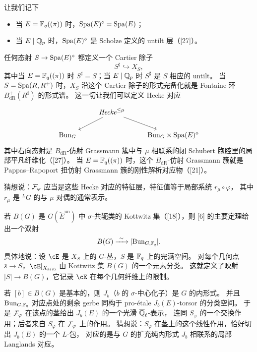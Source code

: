 让我们记下
\begin{itemize}
\item 当 $E=\mathbb{F}_q((\pi))$ 时，$\mathrm{Spa}(E)^\diamond=\mathrm{Spa}(E)$；
\item 当 $E\mid\mathbb{Q}_p$ 时，$\mathrm{Spa}(E)^\diamond$ 是 Scholze 定义的 untilt 层（[27]）。
\end{itemize}
任何态射 $S\to\mathrm{Spa}(E)^\diamond$ 都定义一个 Cartier 除子
\[
S^\sharp\hookrightarrow X_S,
\]
其中当 $E=\mathbb{F}_q((\pi))$ 时 $S^\sharp=S$；当 $E\mid\mathbb{Q}_p$ 时 $S^\sharp$ 是 $S$ 相应的 untilt。
当 $S=\mathrm{Spa}(R,R^+)$ 时，$X_S$ 沿这个 Cartier 除子的形式完备化就是 Fontaine 环 $B_{\mathrm{dR}}^+(R^\sharp)$ 的形式谱。
这一切让我们可以定义 Hecke 对应
\begin{equation}\label{eq:0.1}
\begin{tikzcd}
& \Hck^{\le\mu} \arrow[dl] \arrow[dr] & \\
\Bun_G & & \Bun_G\times\Spa(E)^\diamond
\end{tikzcd}
\end{equation}
其中右向态射是 $B_{\mathrm{dR}}$-仿射 Grassmann 簇中与 $\mu$ 相联系的闭 Schubert 胞腔里的局部平凡纤维化（[27]）。
当 $E=\mathbb{F}_q((\pi))$ 时，这个 $B_{\mathrm{dR}}$-仿射 Grassmann 簇就是 Pappas–Rapoport 扭仿射 Grassmann 簇的刚性解析对应物（[21]）。

猜想说：$\mathcal{F}_\varphi$ 应当是这些 Hecke 对应的特征层，特征值等于局部系统 $r_\mu\circ\varphi$，
其中 $r_\mu$ 是 ${}^{L}G$ 的与 $\mu$ 对偶的通常表示。

若 $B(G)$ 是 $G(\breve E^{\mathrm{un}})$ 中 $\sigma$-共轭类的 Kottwitz 集（[18]），则 [6] 的主要定理给出一个双射
\[
B(G)\xrightarrow{\ \sim\ }|\Bun_{G,\FF_q}|.
\]
具体地说：设 $\cE$ 是 $X_S$ 上的 $G$-丛，$S$ 是 $\mathbb{F}_q$ 上的完满空间。
对每个几何点 $\bar s\to S$，$\cE|_{X_{k(\bar s)}}$ 由 Kottwitz 集 $B(G)$ 的一个元素分类。
这就定义了映射 $|S|\to B(G)$，它记录 $\cE$ 在每个几何纤维上的限制。

若 $[b]\in B(G)$ 是基本的，则 $J_b$（$b$ 的 $\sigma$-中心化子）是 $G$ 的内形式。
并且 $\mathrm{Bun}_{G,\mathbb{F}_q}$ 对应点处的剩余 gerbe 同构于 pro-étale $J_b(E)$-torsor 的分类空间。
于是 $\mathcal{F}_\varphi$ 在该点的茎给出 $J_b(E)$ 的一个光滑 $\overline{\mathbb{Q}}_\ell$-表示，
连同 $S_\varphi$ 的一个交换作用；后者来自 $S_\varphi$ 在 $\mathcal{F}_\varphi$ 上的作用。
猜想说：$S_\varphi$ 在茎上的这个线性作用，恰好切出 $J_b(E)$ 的一个 $L$-包，
对应的是与 $G$ 的扩充纯内形式 $J_b$ 相联系的局部 Langlands 对应。

